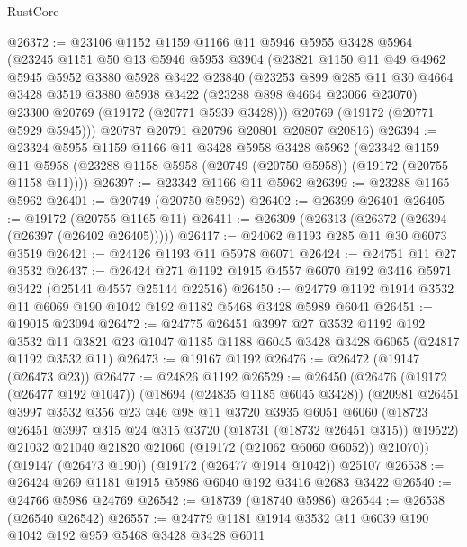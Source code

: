 \begin{lexlean}{RustCore}
\begin{coremodule}
@26372 := @23106
    @1152
    @1159
    @1166
    @11
    @5946
    @5955
    @3428
    @5964
    (@23245
      @1151
      @50
      @13
      @5946
      @5953
      @3904
      (@23821
        @1150
        @11
        @49
        @4962
        @5945
        @5952
        @3880
        @5928
        @3422
        @23840
        (@23253
          @899
          @285
          @11
          @30
          @4664
          @3428
          @3519
          @3880
          @5938
          @3422
          (@23288 @898 @4664 @23066 @23070)
          @23300
          @20769
          (@19172 (@20771 @5939 @3428)))
        @20769
        (@19172 (@20771 @5929 @5945)))
      @20787
      @20791
      @20796
      @20801
      @20807
      @20816)
@26394 := @23324
    @5955
    @1159
    @1166
    @11
    @3428
    @5958
    @3428
    @5962
    (@23342
      @1159
      @11
      @5958
      (@23288 @1158 @5958 (@20749 (@20750 @5958)) (@19172 (@20755 @1158 @11))))
@26397 := @23342 @1166 @11 @5962
@26399 := @23288 @1165 @5962
@26401 := @20749 (@20750 @5962)
@26402 := @26399 @26401
@26405 := @19172 (@20755 @1165 @11)
@26411 := @26309 (@26313 (@26372 (@26394 (@26397 (@26402 @26405)))))
@26417 := @24062 @1193 @285 @11 @30 @6073 @3519
@26421 := @24126 @1193 @11 @5978 @6071
@26424 := @24751 @11 @27 @3532
@26437 := @26424 @271 @1192 @1915 @4557 @6070 @192 @3416 @5971 @3422 (@25141 @4557 @25144 @22516)
@26450 := @24779 @1192 @1914 @3532 @11 @6069 @190 @1042 @192 @1182 @5468 @3428 @5989 @6041
@26451 := @19015 @23094
@26472 := @24775
    @26451
    @3997
    @27
    @3532
    @1192
    @192
    @3532
    @11
    @3821
    @23
    @1047
    @1185
    @1188
    @6045
    @3428
    @3428
    @6065
    (@24817 @1192 @3532 @11)
@26473 := @19167 @1192
@26476 := @26472 (@19147 (@26473 @23))
@26477 := @24826 @1192
@26529 := @26450
    (@26476
      (@19172 (@26477 @192 @1047))
      (@18694 (@24835 @1185 @6045 @3428))
      (@20981
        @26451
        @3997
        @3532
        @356
        @23
        @46
        @98
        @11
        @3720
        @3935
        @6051
        @6060
        (@18723 @26451 @3997 @315 @24 @315 @3720 (@18731 (@18732 @26451 @315)) @19522)
        @21032
        @21040
        @21820
        @21060
        (@19172 (@21062 @6060 @6052))
        @21070))
    (@19147 (@26473 @190))
    (@19172 (@26477 @1914 @1042))
    @25107
@26538 := @26424 @269 @1181 @1915 @5986 @6040 @192 @3416 @2683 @3422
@26540 := @24766 @5986 @24769
@26542 := @18739 (@18740 @5986)
@26544 := @26538 (@26540 @26542)
@26557 := @24779 @1181 @1914 @3532 @11 @6039 @190 @1042 @192 @959 @5468 @3428 @3428 @6011

\end{coremodule}
\end{lexlean}
